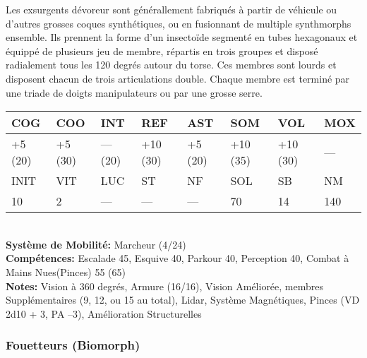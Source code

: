 Les exsurgents dévoreur sont générallement fabriqués à partir de véhicule ou d'autres grosses coques synthétiques, ou en fusionnant de multiple synthmorphs ensemble. Ils prennent la forme d'un insectoïde segmenté en tubes hexagonaux et équippé de plusieurs jeu de membre, répartis en trois groupes et disposé radialement tous les 120 degrés autour du torse. Ces membres sont lourds et disposent chacun de trois articulations double. Chaque membre est terminé par une triade de doigts manipulateurs ou par une grosse serre. \\ \begin{tabular}{|l|l|l|l|l|l|l|l|} \hline

COG &COO &INT &REF &AST &SOM &VOL &MOX \\ \hline

+5 (20) &+5 (30) &— (20) &+10 (30) &+5 (20) &+10 (35) &+10 (30) &— \\ \hline

INIT &VIT &LUC &ST &NF &SOL &SB &NM \\ \hline

10 &2 &— &— &— &70 &14 &140 \\ \hline

\end{tabular} \\ \textbf{Système de Mobilité:} Marcheur (4/24) \\ \textbf{Compétences:} Escalade 45, Esquive 40, Parkour 40, Perception 40, Combat à Mains Nues(Pinces) 55 (65) \\ \textbf{Notes: }Vision à 360 degrés, Armure (16/16), Vision Améliorée, membres Supplémentaires (9, 12, ou 15 au total), Lidar, Système Magnétiques, Pinces (VD 2d10 + 3, PA –3), Amélioration Structurelles 

\subsubsection{Fouetteurs (Biomorph)} 

